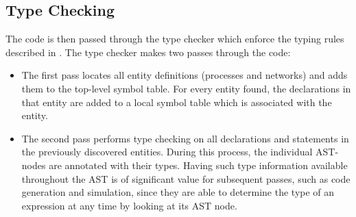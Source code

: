 


\subsection{Type Checking} The code is then passed through the type checker
which enforce the typing rules described in . The type checker
makes two passes through the code:
\begin{itemize}
\item The first pass locates all entity definitions (processes and networks) and
  adds them to the top-level symbol table. For every entity found, the
  declarations in that entity are added to a local symbol table which is
  associated with the entity.
\item The second pass performs type checking on all declarations and statements
  in the previously discovered entities. During this process, the individual
  AST-nodes are annotated with their types.
  Having such type information available throughout the AST is of significant
  value for subsequent passes, such as code generation and simulation, since
  they are able to determine the type of an expression at any time by looking at
  its AST node.

\end{itemize}

